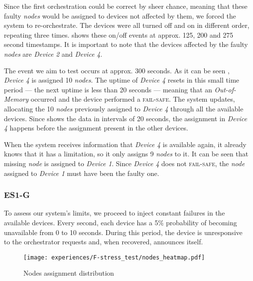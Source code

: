 Since the first orchestration could be correct by sheer chance, meaning that these faulty \textit{nodes} would be assigned to devices not affected by them, we forced the system to re-orchestrate. The devices were all turned off and on in different order, repeating three times.  shows these on/off events at approx. 125, 200 and 275 second timestamps. It is important to note that the devices affected by the faulty \textit{nodes} are \textit{Device 2} and \textit{Device 4}.

The event we aim to test occurs at approx. 300 seconds. As it can be seen , \textit{Device 4} is assigned 10 \textit{nodes}. The uptime of \textit{Device 4} resets in this small time period --- the next uptime is less than 20 seconds --- meaning that an \textit{Out-of-Memory} occurred and the device performed a \textsc{fail-safe}. The system updates, allocating the 10 \textit{nodes} previously assigned to \textit{Device 4} through all the available devices. Since  shows the data in intervals of 20 seconds, the assignment in \textit{Device 4} happens before the assignment present in the other devices.

When the system receives information that \textit{Device 4} is available again, it already knows that it has a limitation, so it only assigns 9 \textit{nodes} to it. It can be seen that missing \textit{node} is assigned to \textit{Device 1}. Since \textit{Device 4} does not \textsc{fail-safe}, the \textit{node} assigned to \textit{Device 1} must have been the faulty one.


\subsubsection{ES1-G}\label{sec:experiment_f}

To assess our system's limits, we proceed to inject constant failures in the available devices. Every second, each device has a 5\% probability of becoming unavailable from 0 to 10 seconds. During this period, the device is unresponsive to the orchestrator requests and, when recovered, announces itself.

\begin{figure*}[h]
    \centering
    \texttt{[image: experiences/F-stress\_test/nodes\_heatmap.pdf]}
    \caption[Nodes assignment distribution]{Nodes assignment distribution}\label{fig:stress_test_nodes}
\end{figure*}

